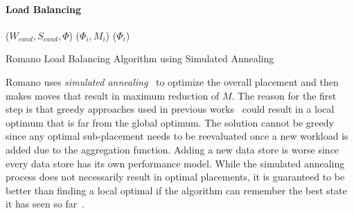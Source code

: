 \paragraph{Load Balancing}
\begin{algorithm}[!t]
\DontPrintSemicolon
{}
\updateMerit($W_{cand}, S_{cand}, \Phi$)
\minimizeMerit($\Phi_i, M_i$)
\loadBalance($\Phi_i$)
\caption{Romano Load Balancing Algorithm using Simulated Annealing}\label{algo}
\end{algorithm}
Romano uses \emph{simulated annealing}~\cite{kirkpatrick:1983} to optimize the overall placement and then makes moves that result in maximum reduction of $M$.
The reason for the first step is that greedy approaches used in previous works~\cite{gulati:2010, gulati:2011, singh:2008} could result in a local optimum that is far from the global optimum.
The solution cannot be greedy since any optimal sub-placement needs to be reevaluated once a new workload is added due to the aggregation function.
Adding a new data store is worse since every data store has its own performance model.
While the simulated annealing process does not necessarily result in optimal placements, it is guaranteed to be better than finding a local optimal if the algorithm can remember the best state it has seen so far~\cite{granville:1994}.

